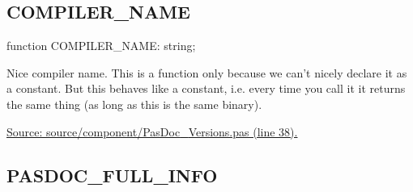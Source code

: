 \documentclass{report}
\newif\ifpdf
\begin{document}
\subsection*{COMPILER{\_}NAME}
\fi
\label{PasDoc_Versions-COMPILER_NAME}
\begin{list}{}{
\setlength{\itemindent}{0cm}
\setlength{\listparindent}{0cm}
\setlength{\leftmargin}{\evensidemargin}
\addtolength{\leftmargin}{\tmplength}
\settowidth{\labelsep}{X}
\addtolength{\leftmargin}{\labelsep}
\setlength{\labelwidth}{\tmplength}
}
\item[\textbf{Declaration}\hfill]
\ifpdf
\begin{flushleft}
\fi
\begin{ttfamily}
function COMPILER{\_}NAME: string;\end{ttfamily}

\ifpdf
\end{flushleft}
\fi

\par
\item[\textbf{Description}]
Nice compiler name. This is a function only because we can't nicely declare it as a constant. But this behaves like a constant, i.e. every time you call it it returns the same thing (as long as this is the same binary).\par
\href{https://github.com/pasdoc/pasdoc/blob/master/source/component/PasDoc_Versions.pas#L38}{Source: source/component/PasDoc{\_}Versions.pas (line 38).}

\end{list}
\ifpdf
\subsection*{\large{\textbf{PASDOC{\_}FULL{\_}INFO}}\normalsize\hspace{1ex}\hrulefill}
\else
\end{document}
